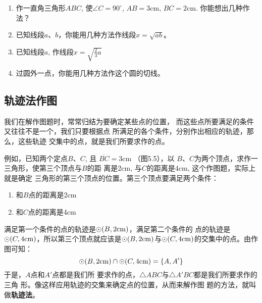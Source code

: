 \begin{ex}
\begin{enumerate}
    \item 作一直角三角形$ABC$, 使$\angle C=90^{\circ}$, $AB=3$cm, $BC=
    2$cm. 你能想出几种作法？
    \item 已知线段$a$、$b$，你能用几种方法作线段$x=\sqrt{ab}$。
    \item 已知线段$a$, 作线段$x=\sqrt{\frac{2}{3}a}$
        \item 过圆外一点，你能用几种方法作这个圆的切线。
\end{enumerate}
\end{ex}

\subsection{轨迹法作图}
我们在解作图题时，常常归结为要确定某些点的位置，
而这些点所要满足的条件又往往不是一个，我们只要根据点
所满足的各个条件，分别作出相应的轨迹，那么，这些轨迹
交集中的点，就是我们所要求作的点。

例如，已知两个定点$B$、$C$, 且
$\overline{BC}=3$cm （图5.5），以
$B$、$C$为两个顶点，求作一三角形，使第三个顶点与$B$的距
离是2cm, 与$C$的距离是4cm, 这个作图题，实际上就是确定
三角形的第三个顶点的位置。第三个顶点要满足两个条件：
\begin{enumerate}
    \item 和$B$点的距离是2cm
    \item 和$C$点的距离是4cm
\end{enumerate}
满足第一个条件的点的轨迹是$\odot(B,2{\rm cm})$，满足第二个条件的
点的轨迹是$\odot (C,4{\rm cm})$，所以第三个顶点就应该是$\odot(B,2{\rm cm})$与$\odot (C,4{\rm cm})$的交集中的点。由作图可知：
\[\odot(B,2{\rm cm})\cap \odot (C,4{\rm cm})=\{A, A'\}\]
于是，$A$点和$A'$点都是我们所
要求作的点，$\triangle ABC$与$\triangle A'BC$都是我们所要求作的三角
形。像这样应用轨迹的交集来确定点的位置，从而来解作图
题的方法，就叫做\textbf{轨迹法}。

